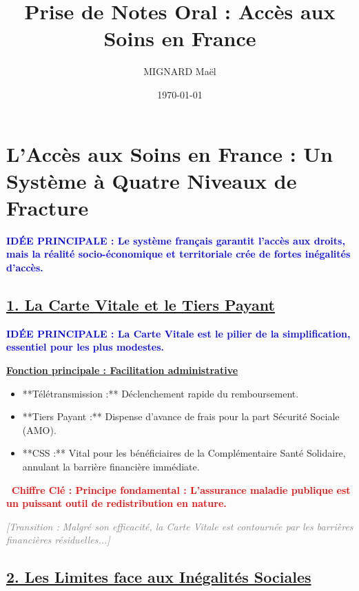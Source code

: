 \documentclass[10pt, a4paper]{article}
\title{\textbf{Prise de Notes Oral : Accès aux Soins en France}}
\author{MIGNARD Maël}
\date{\today}
\newcommand{\IdeeP}[1]{\noindent\textbf{\textcolor{blue}{IDÉE PRINCIPALE : #1}}\par}
\newcommand{\ChiffreCle}[1]{\noindent\textbf{\textcolor{red}{\textbullet\ Chiffre Clé : #1}}\par}
\newcommand{\SousAxe}[1]{\vspace{0.5em}\noindent\underline{\textbf{#1}}\par}
\newcommand{\Transition}[1]{\vspace{1em}\noindent\textit{\textcolor{gray}{[Transition : #1]}}\par}
\begin{document}
\maketitle
\thispagestyle{empty} %


\section*{L'Accès aux Soins en France : Un Système à Quatre Niveaux de Fracture}

\IdeeP{Le système français garantit l'accès aux droits, mais la réalité socio-économique et territoriale crée de fortes inégalités d'accès.}

\subsection*{\underline{1. La Carte Vitale et le Tiers Payant}}

\IdeeP{La Carte Vitale est le pilier de la simplification, essentiel pour les plus modestes.}
\SousAxe{Fonction principale : Facilitation administrative}
\begin{itemize}
    \item **Télétransmission :** Déclenchement rapide du remboursement.
    \item **Tiers Payant :** Dispense d'avance de frais pour la part Sécurité Sociale (AMO).
    \item **CSS :** Vital pour les bénéficiaires de la Complémentaire Santé Solidaire, annulant la barrière financière immédiate.
\end{itemize}
\ChiffreCle{Principe fondamental : L'assurance maladie publique est un puissant outil de redistribution en nature.}

\Transition{Malgré son efficacité, la Carte Vitale est contournée par les barrières financières résiduelles...}

\subsection*{\underline{2. Les Limites face aux Inégalités Sociales}}
\end{document}
